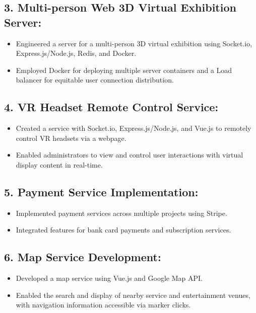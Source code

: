 \documentclass{resume}
\begin{document}
\subsection*{3. Multi-person Web 3D Virtual Exhibition Server:}
\begin{itemize}[noitemsep]
    \item Engineered a server for a multi-person 3D virtual exhibition using Socket.io, Express.js/Node.js, Redis, and Docker.
    \item Employed Docker for deploying multiple server containers and a Load balancer for equitable user connection distribution.
\end{itemize}

\subsection*{4. VR Headset Remote Control Service:}
\begin{itemize}[noitemsep]
    \item Created a service with Socket.io, Express.js/Node.js, and Vue.js to remotely control VR headsets via a webpage.
    \item Enabled administrators to view and control user interactions with virtual display content in real-time.
\end{itemize}

\subsection*{5. Payment Service Implementation:}
\begin{itemize}[noitemsep]
    \item Implemented payment services across multiple projects using Stripe.
    \item Integrated features for bank card payments and subscription services.
\end{itemize}

\subsection*{6. Map Service Development:}
\begin{itemize}[noitemsep]
    \item Developed a map service using Vue.js and Google Map API.
    \item Enabled the search and display of nearby service and entertainment venues, with navigation information accessible via marker clicks.
\end{itemize}
\end{document}
